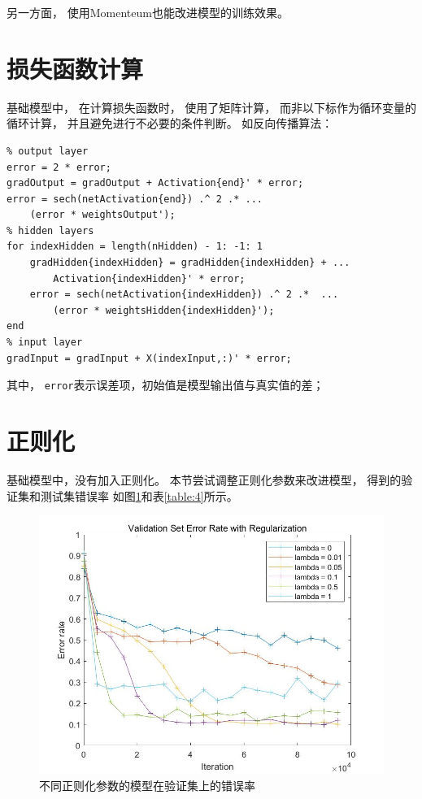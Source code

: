 \documentclass{article}
\begin{document}
另一方面，
使用Momenteum也能改进模型的训练效果。

\section{损失函数计算}

基础模型中，
在计算损失函数时，
使用了矩阵计算，
而非以下标作为循环变量的循环计算，
并且避免进行不必要的条件判断。
如反向传播算法：

\begin{lstlisting}
% output layer
error = 2 * error;
gradOutput = gradOutput + Activation{end}' * error;
error = sech(netActivation{end}) .^ 2 .* ...
    (error * weightsOutput');
% hidden layers
for indexHidden = length(nHidden) - 1: -1: 1
    gradHidden{indexHidden} = gradHidden{indexHidden} + ...
        Activation{indexHidden}' * error;
    error = sech(netActivation{indexHidden}) .^ 2 .*  ...
        (error * weightsHidden{indexHidden}');
end
% input layer
gradInput = gradInput + X(indexInput,:)' * error;
\end{lstlisting}

其中，
\verb|error|表示误差项，初始值是模型输出值与真实值的差；

\section{正则化}

基础模型中，没有加入正则化。
本节尝试调整正则化参数来改进模型，
得到的验证集和测试集错误率
如图\ref{fig:4}和表\ref{table:4}所示。

\begin{figure}[h]
\includegraphics[width=\textwidth]{4.jpg}
\caption{不同正则化参数的模型在验证集上的错误率}
\label{fig:4}
\end{figure}
\end{document}
